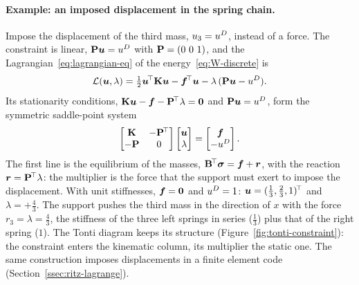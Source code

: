 \paragraph{Example: an imposed displacement in the spring chain.}
%
Impose the displacement of the third mass, $u_3=u^{D}$, instead of a force.
The constraint is linear, $\mathbf{P}\bm{u}=u^{D}$ with $\mathbf{P}=(0\ 0\ 1)$, and the
Lagrangian~\eqref{eq:lagrangian-eq} of the energy~\eqref{eq:W-discrete} is
\[
  \mathcal L(\bm{u},\lambda)=\tfrac12\bm{u}^{\!\top}\mathbf{K}\bm{u}-\bm{f}^{\!\top}\bm{u}-\lambda\,(\mathbf{P}\bm{u}-u^{D}).
\]
Its stationarity conditions, $\mathbf{K}\bm{u}-\bm{f}-\mathbf{P}^{\!\top}\lambda=\bm{0}$ and
$\mathbf{P}\bm{u}=u^{D}$, form the symmetric saddle-point system
\begin{equation}\label{eq:saddle-springs}
  \begin{bmatrix}\mathbf{K}&-\mathbf{P}^{\!\top}\\ -\mathbf{P}&0\end{bmatrix}
  \begin{bmatrix}\bm{u}\\ \lambda\end{bmatrix}=
  \begin{bmatrix}\bm{f}\\ -u^{D}\end{bmatrix}.
\end{equation}
The first line is the equilibrium of the masses,
$\mathbf{B}^{\!\top}\bm{\sigma}=\bm{f}+\bm{r}$, with the reaction
$\bm{r}=\mathbf{P}^{\!\top}\lambda$: the multiplier is the force that the support
must exert to impose the displacement. With unit stiffnesses, $\bm{f}=\bm{0}$ and
$u^{D}=1$: $\bm{u}=(\tfrac13,\tfrac23,1)^{\!\top}$ and $\lambda=+\tfrac43$. The support
pushes the third mass in the direction of $x$ with the force
$r_3=\lambda=\tfrac43$, the stiffness of the three left springs in series
($\tfrac13$) plus that of the right spring ($1$).
The Tonti diagram keeps its structure (Figure~\ref{fig:tonti-constraint}):
the constraint enters the kinematic column, its multiplier the static one.
The same construction imposes displacements in a finite element code
(Section~\ref{ssec:ritz-lagrange}).

